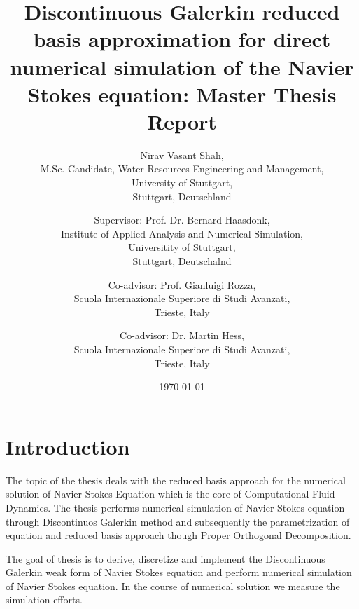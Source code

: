 \documentclass[a4paper,10pt]{book}
\begin{document}
\begin{center}

\title{Discontinuous Galerkin reduced basis approximation for direct numerical simulation of the Navier Stokes equation: Master Thesis Report}


\author{Nirav Vasant Shah, \\M.Sc. Candidate, Water Resources Engineering and Management, \\University of Stuttgart, \\Stuttgart, Deutschland\\ 
\and Supervisor: Prof. Dr. Bernard Haasdonk,\\ Institute of Applied Analysis and Numerical Simulation, \\Universitity of Stuttgart,\\ Stuttgart, Deutschalnd\\ \and Co-advisor: Prof. Gianluigi Rozza,\\ Scuola Internazionale Superiore di Studi Avanzati, \\Trieste, Italy \\ \and Co-advisor: Dr. Martin Hess,\\ Scuola Internazionale Superiore di Studi Avanzati, \\Trieste, Italy }
\date{\today}
\maketitle

\end{center}

\tableofcontents






\chapter{Introduction}

The topic of the thesis deals with the reduced basis approach for the numerical solution of Navier Stokes Equation which is the core of Computational Fluid Dynamics. The thesis performs numerical simulation of Navier Stokes equation through Discontinuos Galerkin method and subsequently the parametrization of equation and reduced basis approach though Proper Orthogonal Decomposition.

The goal of thesis is to derive, discretize and implement the Discontinuous Galerkin weak form of Navier Stokes equation and perform numerical simulation of Navier Stokes equation. In the course of numerical solution we measure the simulation efforts.
\end{document}
